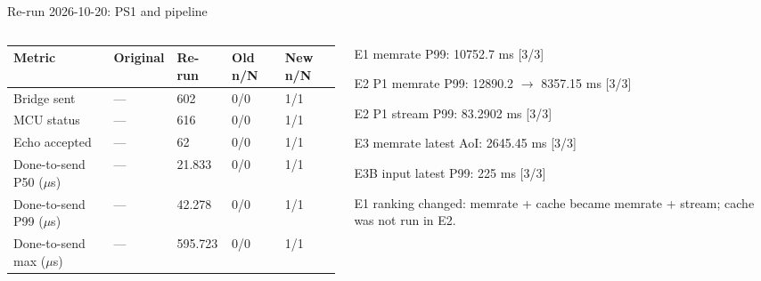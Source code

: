 \begin{frame}[t]{Re-run 2026-10-20: PS1 and pipeline}
\begin{columns}[T]\begin{column}{0.49\textwidth}{\scriptsize\begin{tabular}{@{}lllll@{}}\toprule
Metric & Original & Re-run & Old n/N & New n/N \\\midrule
Bridge sent & — & 602 & 0/0 & 1/1 \\
MCU status & — & 616 & 0/0 & 1/1 \\
Echo accepted & — & 62 & 0/0 & 1/1 \\
Done-to-send P50 (\(\mu\)s) & — & 21.833 & 0/0 & 1/1 \\
Done-to-send P99 (\(\mu\)s) & — & 42.278 & 0/0 & 1/1 \\
Done-to-send max (\(\mu\)s) & — & 595.723 & 0/0 & 1/1 \\
\bottomrule\end{tabular}}\end{column}\begin{column}{0.49\textwidth}{\scriptsize E1 memrate P99: 10752.7 ms [3/3]\par E2 P1 memrate P99: 12890.2 $\to$ 8357.15 ms [3/3]\par E2 P1 stream P99: 83.2902 ms [3/3]\par E3 memrate latest AoI: 2645.45 ms [3/3]\par E3B input latest P99: 225 ms [3/3]\par\smallskip E1 ranking changed: memrate + cache became memrate + stream; cache was not run in E2.}\end{column}\end{columns}\par{}
\end{frame}
